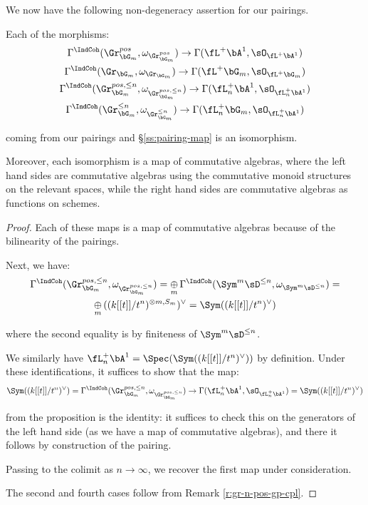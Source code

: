 We now have the following non-degeneracy assertion for our
pairings.

\begin{prop}
\notready\label{p:cc-log}

Each of the morphisms:
%
\[
\begin{gathered}
\Gamma^{\IndCoh}(\Gr_{\bG_m}^{pos},\omega_{\Gr_{\bG_m}^{pos}})
\to \Gamma(\fL^+ \bA^1,\sO_{\fL^+ \bA^1}) \\
\Gamma^{\IndCoh}(\Gr_{\bG_m},\omega_{\Gr_{\bG_m}})
\to \Gamma(\fL^+ \bG_m,\sO_{\fL^+ \bG_m}) \\
\Gamma^{\IndCoh}(\Gr_{\bG_m}^{pos,\leq n},\omega_{\Gr_{\bG_m}^{pos,\leq n}})
\to \Gamma(\fL_n^+ \bA^1,\sO_{\fL_n^+ \bA^1}) \\
\Gamma^{\IndCoh}(\Gr_{\bG_m}^{\leq n},\omega_{\Gr_{\bG_m}^{\leq n}})
\to \Gamma(\fL_n^+ \bG_m,\sO_{\fL_n^+ \bA^1})
\end{gathered}
\]

 coming from our pairings and \S \ref{ss:pairing-map}
is an isomorphism.

Moreover, each isomorphism is a map of commutative algebras,
where the left hand sides are commutative algebras using
the commutative monoid structures on the relevant spaces,
while the right hand sides are commutative algebras
as functions on schemes.

\end{prop}

\begin{proof}

Each of these maps is a map of commutative algebras
because of the bilinearity of the pairings.

Next, we have:
%
\[
\begin{gathered}
\Gamma^{\IndCoh}(\Gr_{\bG_m}^{pos,\leq n},\omega_{\Gr_{\bG_m}^{pos,\leq n}}) =
\underset{m}{\oplus} \,
\Gamma^{\IndCoh}(\Sym^m\sD^{\leq n},\omega_{\Sym^m\sD^{\leq n}})
= \\
\underset{m}{\oplus} \, ((k[[t]]/t^n)^{\otimes m,S_m})^{\vee}
= \Sym((k[[t]]/t^n)^{\vee})
\end{gathered}
\]

 where the second equality is by finiteness of
$\Sym^m \sD^{\leq n}$.

We similarly have
$\fL_n^+ \bA^1 = \Spec(\Sym((k[[t]]/t^n)^{\vee}))$ by
definition. Under these identifications, it suffices to
show that the map:
%
\[
\Sym((k[[t]]/t^n)^{\vee}) =
\Gamma^{\IndCoh}(\Gr_{\bG_m}^{pos,\leq n},\omega_{\Gr_{\bG_m}^{pos,\leq n}})
\to \Gamma(\fL_n^+ \bA^1,\sO_{\fL_n^+ \bA^1}) =
\Sym((k[[t]]/t^n)^{\vee})
\]

 from the proposition is the identity:
it suffices to check this on
the generators of the left hand side (as we have a map
of commutative algebras), and there it follows
by construction of the pairing.

Passing to the colimit as $n \to \infty$, we recover
the first map under consideration.

The second and fourth cases follow from Remark \ref{r:gr-n-pos-gp-cpl}.

\end{proof}

